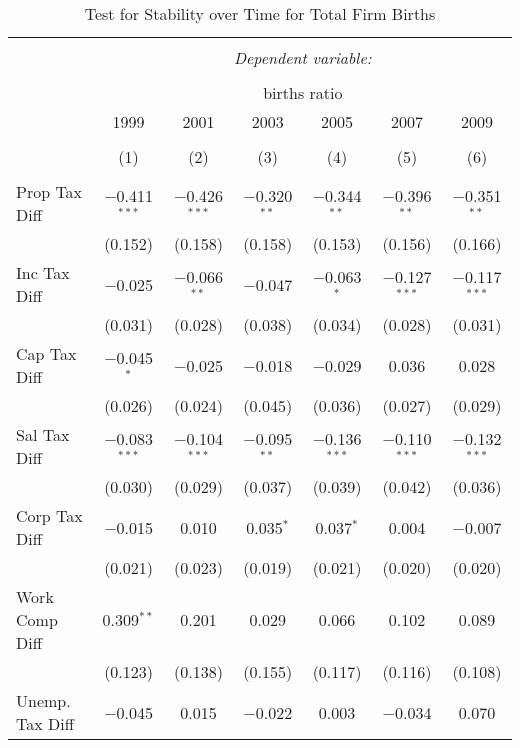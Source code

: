 
\begin{table}[!htbp] \centering 
  \caption{Test for Stability over Time for  Total Firm Births} 
  \label{--year} 
\small 
\begin{tabular}{@{\extracolsep{5pt}}lcccccc} 
\\[-1.8ex]\hline 
\hline \\[-1.8ex] 
 & \multicolumn{6}{c}{\textit{Dependent variable:}} \\ 
\cline{2-7} 
\\[-1.8ex] & \multicolumn{6}{c}{births ratio} \\ 
 & 1999 & 2001 & 2003 & 2005 & 2007 & 2009 \\ 
\\[-1.8ex] & (1) & (2) & (3) & (4) & (5) & (6)\\ 
\hline \\[-1.8ex] 
 Prop Tax Diff & $-$0.411$^{***}$ & $-$0.426$^{***}$ & $-$0.320$^{**}$ & $-$0.344$^{**}$ & $-$0.396$^{**}$ & $-$0.351$^{**}$ \\ 
  & (0.152) & (0.158) & (0.158) & (0.153) & (0.156) & (0.166) \\ 
  Inc Tax Diff & $-$0.025 & $-$0.066$^{**}$ & $-$0.047 & $-$0.063$^{*}$ & $-$0.127$^{***}$ & $-$0.117$^{***}$ \\ 
  & (0.031) & (0.028) & (0.038) & (0.034) & (0.028) & (0.031) \\ 
  Cap Tax Diff & $-$0.045$^{*}$ & $-$0.025 & $-$0.018 & $-$0.029 & 0.036 & 0.028 \\ 
  & (0.026) & (0.024) & (0.045) & (0.036) & (0.027) & (0.029) \\ 
  Sal Tax Diff & $-$0.083$^{***}$ & $-$0.104$^{***}$ & $-$0.095$^{**}$ & $-$0.136$^{***}$ & $-$0.110$^{***}$ & $-$0.132$^{***}$ \\ 
  & (0.030) & (0.029) & (0.037) & (0.039) & (0.042) & (0.036) \\ 
  Corp Tax Diff & $-$0.015 & 0.010 & 0.035$^{*}$ & 0.037$^{*}$ & 0.004 & $-$0.007 \\ 
  & (0.021) & (0.023) & (0.019) & (0.021) & (0.020) & (0.020) \\ 
  Work Comp Diff & 0.309$^{**}$ & 0.201 & 0.029 & 0.066 & 0.102 & 0.089 \\ 
  & (0.123) & (0.138) & (0.155) & (0.117) & (0.116) & (0.108) \\ 
  Unemp. Tax Diff & $-$0.045 & 0.015 & $-$0.022 & 0.003 & $-$0.034 & 0.070 \\ 

\end{tabular}
\end{table}
